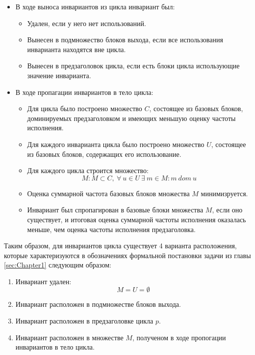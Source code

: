 \begin{itemize}
    \item В ходе выноса инвариантов из цикла инвариант был:
        \begin{itemize}
            \item Удален, если у него нет использований.
            \item Вынесен в подмножество блоков выхода, если все использования инварианта находятся вне цикла.
            \item Вынесен в предзаголовок цикла, если есть блоки цикла использующие значение инварианта.
        \end{itemize}
    \item В ходе пропагации инвариантов в тело цикла:
        \begin{itemize}
            \item Для цикла было построено множество $C$, состоящее из базовых блоков, доминируемых предзаголовком и имеющих меньшую оценку частоты исполнения.
            \item Для каждого инварианта цикла было построено множество $U$, состоящее из базовых блоков, содержащих его использование.
            \item Для каждого цикла строится множество:
                $$ M : M \subset C, \: \forall \: u \in U \: \exists \: m \in M : m \: dom \: u $$
            \item Оценка суммарной частота базовых блоков множества $M$ минимизруется. 
            \item Инвариант был спропагирован в базовые блоки множества $M$, если оно существует, и итоговая оценка суммарной частоты исполнения оказалась меньше, чем оценка частоты исполнения предзаголовка.
        \end{itemize}
\end{itemize}

Таким образом, для инвариантов цикла существует 4 варианта расположения, которые характеризуются в обозначениях формальной постановки задачи из главы \ref{sec:Chapter1} следующим образом:
\begin{enumerate}
    \item Инвариант удален:
        $$ M = U = \emptyset $$
    \item Инвариант расположен в подмножестве блоков выхода.
    \item Инвариант расположен в предзаголовке цикла $p$.
    \item Инвариант расположен в множестве $M$, полученом в ходе пропогации инвариантов в тело цикла.
\end{enumerate}

